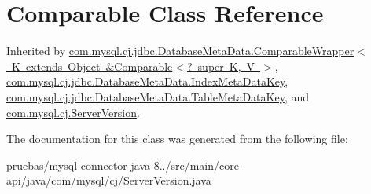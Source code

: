\hypertarget{class_comparable}{}\section{Comparable Class Reference}
\label{class_comparable}


Inherited by \mbox{\hyperlink{classcom_1_1mysql_1_1cj_1_1jdbc_1_1_database_meta_data_1_1_comparable_wrapper}{com.\+mysql.\+cj.\+jdbc.\+Database\+Meta\+Data.\+Comparable\+Wrapper$<$ K extends Object \&\+Comparable$<$? super K, V $>$}}, \mbox{\hyperlink{classcom_1_1mysql_1_1cj_1_1jdbc_1_1_database_meta_data_1_1_index_meta_data_key}{com.\+mysql.\+cj.\+jdbc.\+Database\+Meta\+Data.\+Index\+Meta\+Data\+Key}}, \mbox{\hyperlink{classcom_1_1mysql_1_1cj_1_1jdbc_1_1_database_meta_data_1_1_table_meta_data_key}{com.\+mysql.\+cj.\+jdbc.\+Database\+Meta\+Data.\+Table\+Meta\+Data\+Key}}, and \mbox{\hyperlink{classcom_1_1mysql_1_1cj_1_1_server_version}{com.\+mysql.\+cj.\+Server\+Version}}.



The documentation for this class was generated from the following file\+:\begin{DoxyCompactItemize}
\item 
pruebas/mysql-\/connector-\/java-\/8../src/main/core-\/api/java/com/mysql/cj/Server\+Version.\+java\end{DoxyCompactItemize}
